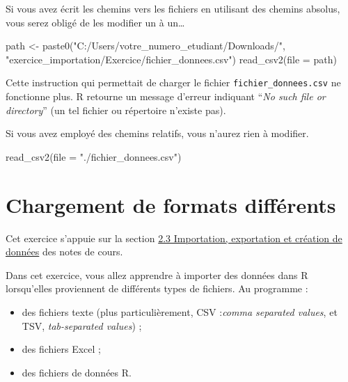\documentclass[
  11pt,
]{book}
\newenvironment{Shaded}{\begin{snugshade}}{\end{snugshade}}
\newcommand{\AttributeTok}[1]{\textcolor[rgb]{0.77,0.63,0.00}{#1}}
\newcommand{\FunctionTok}[1]{\textcolor[rgb]{0.00,0.00,0.00}{#1}}
\newcommand{\NormalTok}[1]{#1}
\newcommand{\OtherTok}[1]{\textcolor[rgb]{0.56,0.35,0.01}{#1}}
\newcommand{\StringTok}[1]{\textcolor[rgb]{0.31,0.60,0.02}{#1}}
\providecommand{\tightlist}{%
  \setlength{\itemsep}{0pt}\setlength{\parskip}{0pt}}
\numberwithin{equation}{section}
\numberwithin{countremarque}{section}
\newenvironment{orangebox}{
  \begin{tcolorbox}[breakable, colback=oran,coltext=white,
                  colframe=grisfonce]}
 {\end{tcolorbox}}
\begin{document}
Si vous avez écrit les chemins vers les fichiers en utilisant des chemins absolus, vous serez obligé de les modifier un à un\ldots{}

\begin{Shaded}
\begin{Highlighting}[]
\NormalTok{path }\OtherTok{\textless{}{-}} \FunctionTok{paste0}\NormalTok{(}\StringTok{"C:/Users/votre\_numero\_etudiant/Downloads/"}\NormalTok{,}
               \StringTok{"exercice\_importation/Exercice/fichier\_donnees.csv"}\NormalTok{)}
\FunctionTok{read\_csv2}\NormalTok{(}\AttributeTok{file =}\NormalTok{ path)}
\end{Highlighting}
\end{Shaded}

Cette instruction qui permettait de charger le fichier \texttt{fichier\_donnees.csv} ne fonctionne plus. R retourne un message d'erreur indiquant ``\emph{No such file or directory}'' (un tel fichier ou répertoire n'existe pas).

Si vous avez employé des chemins relatifs, vous n'aurez rien à modifier.

\begin{Shaded}
\begin{Highlighting}[]
\FunctionTok{read\_csv2}\NormalTok{(}\AttributeTok{file =} \StringTok{"./fichier\_donnees.csv"}\NormalTok{)}
\end{Highlighting}
\end{Shaded}

\hypertarget{chargement-de-formats-diffuxe9rents}{%
\section{Chargement de formats différents}\label{chargement-de-formats-diffuxe9rents}}

\begin{orangebox}
Cet exercice s'appuie sur la section \href{http://egallic.fr/Enseignement/R/Book/donn\%C3\%A9es.html\#importation-exportation-et-cr\%C3\%A9ation-de-donn\%C3\%A9es}{2.3 Importation, exportation et création de données} des notes de cours.

\end{orangebox}

Dans cet exercice, vous allez apprendre à importer des données dans R lorsqu'elles proviennent de différents types de fichiers. Au programme :

\begin{itemize}
\tightlist
\item
  des fichiers texte (plus particulièrement, CSV :\emph{comma separated values}, et TSV, \emph{tab-separated values}) ;
\item
  des fichiers Excel ;
\item
  des fichiers de données R.
\end{itemize}
\end{document}
